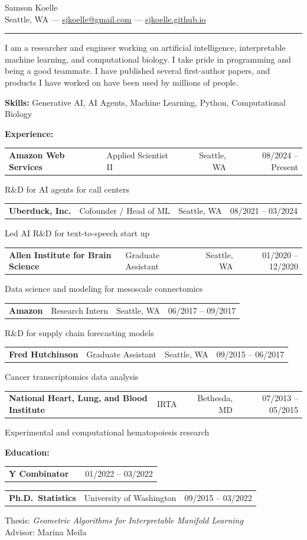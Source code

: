 \documentclass[11pt]{article}
\makeatletter
\newcommand{\fourcol}[4]{%
  \begin{tabular*}{\textwidth}{@{\extracolsep{\fill}} l l r r @{}}
    #1 & #2 & #3 & #4 \\
  \end{tabular*}
}
\newcommand{\threecol}[3]{%
  \begin{tabular*}{\textwidth}{@{\extracolsep{\fill}} l l r @{}}
    #1 & #2 & #3 \\
  \end{tabular*}
}
\makeatother
\begin{document}
\begin{center}
  {\Large Samson Koelle}\\
  \vspace{0.35em}
  Seattle, WA --- \href{mailto:sjkoelle@gmail.com}{sjkoelle@gmail.com}
  --- \url{sjkoelle.github.io}
\end{center}

\vspace{0.3em}
\hrule
\vspace{0.8em}

I am a researcher and engineer working on artificial intelligence, interpretable machine learning, and computational biology.
I take pride in programming and being a good teammate.
I have published several first-author papers, and products I have worked on have been used by millions of people.

\vspace{.25cm} 
\textbf{Skills:} Generative AI, AI Agents, Machine Learning, Python, Computational Biology

\vspace{.25cm} 
\textbf{Experience:}

\fourcol{\textbf{Amazon Web Services}}{Applied Scientist II}{Seattle, WA}{08/2024 -- Present}
R\&D for AI agents for call centers

\fourcol{\textbf{Uberduck, Inc.}}{Cofounder / Head of ML}{Seattle, WA}{08/2021 -- 03/2024}
Led AI R\&D for text-to-speech start up

\fourcol{\textbf{Allen Institute for Brain Science}}{Graduate Assistant}{Seattle, WA}{01/2020 -- 12/2020}
Data science and modeling for mesoscale connectomics

\fourcol{\textbf{Amazon}}{Research Intern}{Seattle, WA}{06/2017 -- 09/2017}
R\&D for supply chain forecasting models

\fourcol{\textbf{Fred Hutchinson}}{Graduate Assistant}{Seattle, WA}{09/2015 -- 06/2017}
Cancer transcriptomics data analysis

\fourcol{\textbf{National Heart, Lung, and Blood Institute}}{IRTA}{Bethesda, MD}{07/2013 -- 05/2015}
Experimental and computational hematopoiesis research

\vspace{.25cm} 
\textbf{Education:}

\threecol{\textbf{Y Combinator}}{}{01/2022 -- 03/2022}
\threecol{\textbf{Ph.D.\ Statistics}}{University of Washington}{09/2015 -- 03/2022}
Thesis: \textit{Geometric Algorithms for Interpretable Manifold Learning}\\
Advisor: Marina Meila
\end{document}
